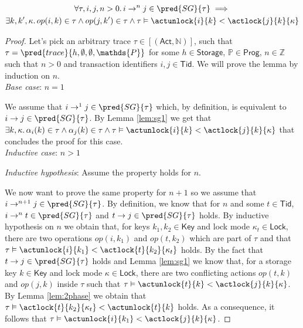 \lem \label{lem:sg2}
\begin{gather*}
\forall \tau, i, j, n > 0 \ldotp i \rightarrow^n j \in \pred{SG}{\tau} \implies \\
\exists k, k', \kappa \ldotp op(i, k) \in \tau \land op(j, k') \in \tau \land \tau \vDash \actunlock{i}{k} < \actlock{j}{k}{\kappa}
\end{gather*}

{\parindent0pt
\begin{proof}
Let's pick an arbitrary trace $\tau \in [(\mathsf{Act}, \mathds{N})]$, such that $\tau = \pred{trace}{h, \emptyset, \emptyset, \mathds{P}}$ for some $h \in \mathsf{Storage}$, $\mathds{P} \in \mathsf{Prog}$, $n \in \mathds{Z}$ such that $n > 0$ and transaction identifiers $i, j \in \mathsf{Tid}$. We will prove the lemma by induction on $n$. \\

\textit{Base case}: $n = 1$

We assume that $i \rightarrow^1 j \in \pred{SG}{\tau}$ which, by definition, is equivalent to $i \rightarrow j \in \pred{SG}{\tau}$. By Lemma \ref{lem:sg1} we get that $\exists k, \kappa \ldotp \alpha_i(k) \in \tau \land \alpha_j(k) \in \tau \land \tau \vDash \actunlock{i}{k} < \actlock{j}{k}{\kappa}$ that concludes the proof for this case. \\

\textit{Inductive case}: $n > 1$

\textit{Inductive hypothesis}: Assume the property holds for $n$.

We now want to prove the same property for $n + 1$ so we assume that $i \rightarrow^{n+1} j \in \pred{SG}{\tau}$. By definition, we know that for $n$ and some $t \in \mathsf{Tid}$, $i \rightarrow^n t \in \pred{SG}{\tau}$ and $t \rightarrow j \in \pred{SG}{\tau}$ holds. By inductive hypothesis on $n$ we obtain that, for keys $k_1, k_2 \in \mathsf{Key}$ and lock mode $\kappa_t \in \mathsf{Lock}$, there are two operations $op(i, k_1)$ and $op(t, k_2)$ which are part of $\tau$ and that $\tau \vDash \actunlock{i}{k_1} < \actlock{t}{k_2}{\kappa_t}$ holds. By the fact that $t \rightarrow j \in \pred{SG}{\tau}$ holds and Lemma \ref{lem:sg1} we know that, for a storage key $k \in \mathsf{Key}$ and lock mode $\kappa \in \mathsf{Lock}$, there are two conflicting actions $op(t, k)$ and $op(j, k)$ inside $\tau$ such that $\tau \vDash \actunlock{t}{k} < \actlock{j}{k}{\kappa}$. By Lemma \ref{lem:2phase} we obtain that $\tau \vDash \actlock{t}{k_2}{\kappa_t} < \actunlock{t}{k}$ holds. As a consequence, it follows that $\tau \vDash \actunlock{i}{k_1} < \actlock{j}{k}{\kappa}$.
\end{proof}
}

